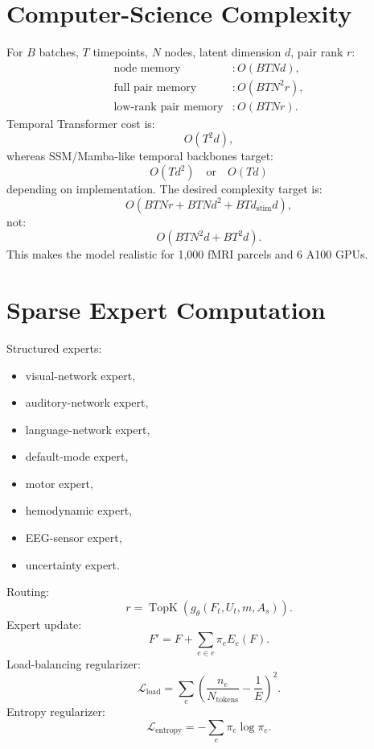 \documentclass[11pt]{article}
\newcommand{\loss}{\mathcal{L}}
\begin{document}
\section{Computer-Science Complexity}

For $B$ batches, $T$ timepoints, $N$ nodes, latent dimension $d$, pair rank $r$:
\begin{align}
\text{node memory} &: O(BTNd),\\
\text{full pair memory} &: O(BTN^2r),\\
\text{low-rank pair memory} &: O(BTNr).
\end{align}
Temporal Transformer cost is:
\begin{equation}
O(T^2d),
\end{equation}
whereas SSM/Mamba-like temporal backbones target:
\begin{equation}
O(Td^2) \quad \text{or} \quad O(Td)
\end{equation}
depending on implementation. The desired complexity target is:
\begin{equation}
O(BTNr + BTNd^2 + BTd_{\mathrm{stim}}d),
\end{equation}
not:
\begin{equation}
O(BTN^2d + BT^2d).
\end{equation}
This makes the model realistic for 1,000 fMRI parcels and 6 A100 GPUs.

\section{Sparse Expert Computation}

Structured experts:
\begin{itemize}
\item visual-network expert,
\item auditory-network expert,
\item language-network expert,
\item default-mode expert,
\item motor expert,
\item hemodynamic expert,
\item EEG-sensor expert,
\item uncertainty expert.
\end{itemize}
Routing:
\begin{equation}
r=\operatorname{TopK}(g_\theta(F_t,U_t,m,A_s)).
\end{equation}
Expert update:
\begin{equation}
F'=F+\sum_{e\in r}\pi_eE_e(F).
\end{equation}
Load-balancing regularizer:
\begin{equation}
\loss_{\mathrm{load}}=\sum_e\left(\frac{n_e}{N_{\mathrm{tokens}}}-\frac{1}{E}\right)^2.
\end{equation}
Entropy regularizer:
\begin{equation}
\loss_{\mathrm{entropy}}=-\sum_e\pi_e\log\pi_e.
\end{equation}
\end{document}
